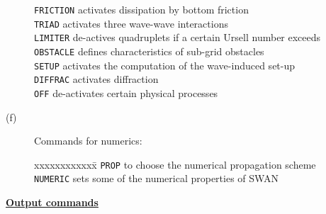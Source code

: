 \documentclass[12pt]{book}
\begin{document}
\begin{description}
\begin{tabbing}
{\tt FRICTION} \> activates dissipation by bottom friction\\
{\tt TRIAD}    \> activates three wave-wave interactions\\
{\tt LIMITER}  \> de-actives quadruplets if a certain Ursell number exceeds\\
{\tt OBSTACLE} \> defines characteristics of sub-grid obstacles\\
{\tt SETUP}    \> activates the computation of the wave-induced set-up\\
{\tt DIFFRAC}  \> activates diffraction\\
{\tt OFF}      \> de-activates certain physical processes\\
\end{tabbing}
  \item[(f)] Commands for numerics:
\begin{tabbing}
xxxxxxxxxxxx\= \kill
{\tt PROP}    \> to choose the numerical propagation scheme\\
{\tt NUMERIC} \> sets some of the numerical properties of SWAN\\
\end{tabbing}
\end{description}
\underline{\bf Output commands}
\end{document}
